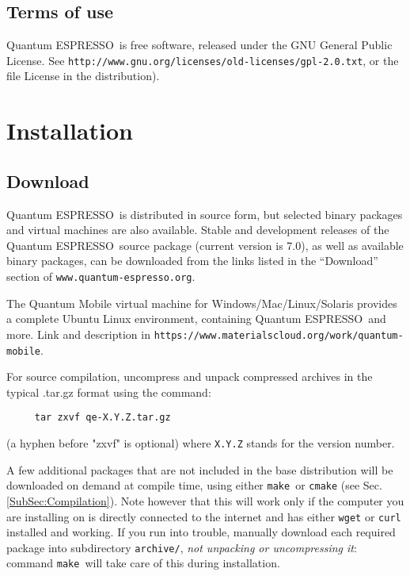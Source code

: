 \documentclass[12pt,a4paper]{article}
\def\version{7.0}
\def\qe{{\sc Quantum ESPRESSO}}
\def\make{\texttt{make}}
\begin{document}
\subsection{Terms of use}
\label{SubSec:Terms}

\qe\ is free software, released under the
GNU General Public License. See
\texttt{http://www.gnu.org/licenses/old-licenses/gpl-2.0.txt},
or the file License in the distribution).


\section{Installation}

\subsection{Download}
\label{SubSec:Download}

\qe\ is distributed in source form, but selected binary packages
and virtual machines are also available.
Stable and development releases of the \qe\ source package
(current version is \version), as well as available binary
packages, can be downloaded from the links listed in the
``Download'' section of \texttt{www.quantum-espresso.org}.

The Quantum Mobile virtual machine for Windows/Mac/Linux/Solaris
provides a complete Ubuntu Linux environment, containing \qe\ and
more. Link and description in
\texttt{https://www.materialscloud.org/work/quantum-mobile}.

For source compilation, uncompress and unpack compressed archives
in the typical .tar.gz format using the command:
\begin{verbatim}
     tar zxvf qe-X.Y.Z.tar.gz
\end{verbatim}
(a hyphen before "zxvf" is optional) where \texttt{X.Y.Z} stands for the
version number.

A few additional packages that are not included in the base distribution
will be downloaded on demand at compile time, using either \make\ or
\texttt{cmake} (see Sec.\ref{SubSec:Compilation}).
Note however that this will work only if the computer you are
installing on is directly connected to the internet and has
either \texttt{wget} or \texttt{curl} installed and working.
If you run into trouble, manually download each required package
into subdirectory \texttt{archive/}, {\em not unpacking or
uncompressing it}:
command \make\ will take care of this during installation.
\end{document}

